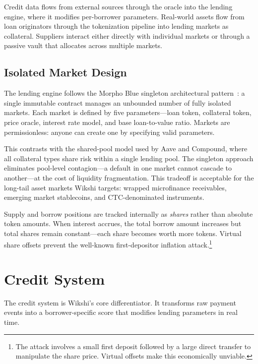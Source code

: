 \documentclass[11pt,a4paper]{article}
\begin{document}
Credit data flows from external sources through the oracle into the lending engine, where it modifies per-borrower parameters. Real-world assets flow from loan originators through the tokenization pipeline into lending markets as collateral. Suppliers interact either directly with individual markets or through a passive vault that allocates across multiple markets.

\subsection{Isolated Market Design}

The lending engine follows the Morpho Blue singleton architectural pattern~\cite{morpho}: a single immutable contract manages an unbounded number of fully isolated markets. Each market is defined by five parameters---loan token, collateral token, price oracle, interest rate model, and base loan-to-value ratio. Markets are permissionless: anyone can create one by specifying valid parameters.

This contrasts with the shared-pool model used by Aave and Compound, where all collateral types share risk within a single lending pool. The singleton approach eliminates pool-level contagion---a default in one market cannot cascade to another---at the cost of liquidity fragmentation. This tradeoff is acceptable for the long-tail asset markets Wikshi targets: wrapped microfinance receivables, emerging market stablecoins, and CTC-denominated instruments.

Supply and borrow positions are tracked internally as \emph{shares} rather than absolute token amounts. When interest accrues, the total borrow amount increases but total shares remain constant---each share becomes worth more tokens. Virtual share offsets prevent the well-known first-depositor inflation attack.\footnote{The attack involves a small first deposit followed by a large direct transfer to manipulate the share price. Virtual offsets make this economically unviable.}

\section{Credit System}

The credit system is Wikshi's core differentiator. It transforms raw payment events into a borrower-specific score that modifies lending parameters in real time.
\end{document}
